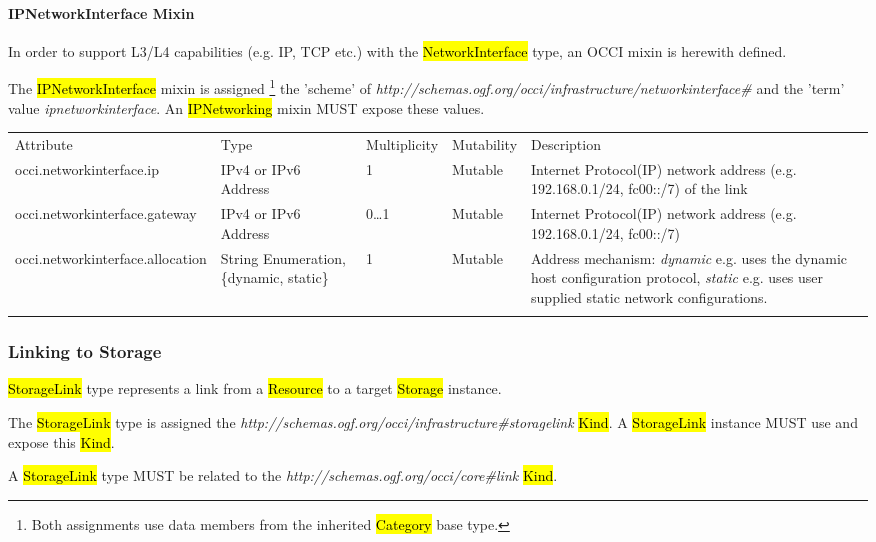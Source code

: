 \documentclass[10pt,a4paper]{article}
\begin{document}
\paragraph{IPNetworkInterface Mixin}
In order to support L3/L4 capabilities (e.g. IP, TCP etc.) with the \hl{NetworkInterface} type, an 
OCCI mixin is herewith defined.

The \hl{IPNetworkInterface} mixin is assigned 
\footnote{Both assignments use data members from the inherited \hl{Category} 
base type.} the 'scheme' of
\textit{http://schemas.ogf.org/occi/infrastructure/networkinterface\#} and the 'term' value 
\textit{ipnetworkinterface}. An \hl{IPNetworking} mixin MUST expose these values.

\begin{tabular}{lp{2.5cm}p{1cm}lp{6cm}}
\toprule
Attribute&Type&Multi\-plicity&Mutability&Description\\
\colrule
occi.networkinterface.ip & IPv4 or IPv6 Address & 1 & Mutable & Internet Protocol(IP) network address (e.g. 192.168.0.1/24, fc00::/7) of the link\\
occi.networkinterface.gateway & IPv4 or IPv6 Address & 0\ldots1 & Mutable & Internet Protocol(IP) network address (e.g. 192.168.0.1/24, fc00::/7)\\
occi.networkinterface.allocation & String Enumeration, \{dynamic, static\} & 1 & Mutable & Address mechanism: \textit{dynamic} e.g. uses the dynamic host configuration protocol, \textit{static} e.g. uses user supplied static network configurations.\\
\botrule
\end{tabular}

\subsubsection{Linking to Storage}
\hl{StorageLink} type represents a link from a \hl{Resource} to a target \hl{Storage} instance.

The \hl{StorageLink} type is assigned the  
\textit{http://schemas.ogf.org/occi/infrastructure\#storagelink} \hl{Kind}. A \hl{StorageLink}
instance MUST use and expose this \hl{Kind}. 

A \hl{StorageLink} type MUST be related to the \textit{http://schemas.ogf.org/occi/core\#link} \hl{Kind}.
\end{document}
